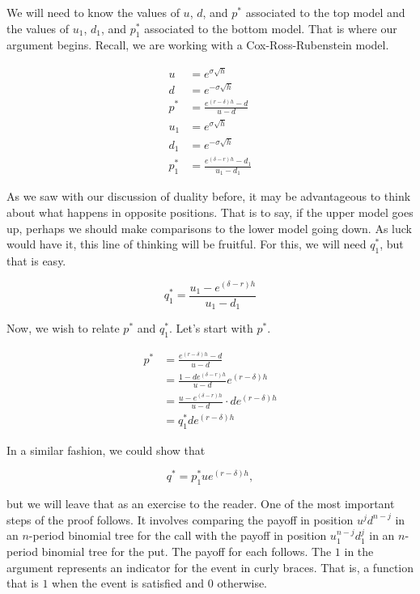 \documentclass{ximera}
\begin{document}
We will need to know the values of $u$, $d$, and $p^*$ associated to the top model and the values of $u_1$, $d_1$, and $p_1^*$ associated to the bottom model. That is where our argument begins. Recall, we are working with a Cox-Ross-Rubenstein model.

\begin{align*}
	u 		&=e^{\sigma\sqrt{h}}\\
	d 		&=e^{-\sigma\sqrt{h}}\\
	p^* 		&=\frac{e^{(r-\delta)h}-d}{u-d}\\
	u_1 		&=e^{\sigma\sqrt{h}}\\
	d_1 		&=e^{-\sigma\sqrt{h}}\\
	p_1^*	&=\frac{e^{(\delta-r)h}-d_1}{u_1-d_1}
\end{align*}

As we saw with our discussion of duality before, it may be advantageous to think about what happens in opposite positions. That is to say, if the upper model goes up, perhaps we should make comparisons to the lower model going down. As luck would have it, this line of thinking will be fruitful. For this, we will need $q_1^*$, but that is easy.

\begin{equation*}
q_1^*=\frac{u_1-e^{(\delta-r)h}}{u_1-d_1}
\end{equation*}

Now, we wish to relate $p^*$ and $q_1^*$. Let's start with $p^*$.

\begin{align*}
p^* 		&=\frac{e^{(r-\delta)h}-d}{u-d}\\
		&=\frac{1-de^{(\delta-r)h}}{u-d}e^{(r-\delta)h}\\
		&=\frac{u-e^{(\delta-r)h}}{u-d}\cdot de^{(r-\delta)h}\\
		&=q_1^*de^{(r-\delta)h}
\end{align*}

In a similar fashion, we could show that

\begin{equation*}
q^* =p_1^*ue^{(r-\delta)h},
\end{equation*}

but we will leave that as an exercise to the reader. One of the most important steps of the proof follows. It involves comparing the payoff in position $u^jd^{n-j}$ in an $n$-period binomial tree for the call with the payoff in position $u_1^{n-j}d_1^{j}$ in an $n$-period binomial tree for the put. The payoff for each follows. The $1$ in the argument represents an indicator for the event in curly braces. That is, a function that is $1$ when the event is satisfied and $0$ otherwise.
\end{document}
